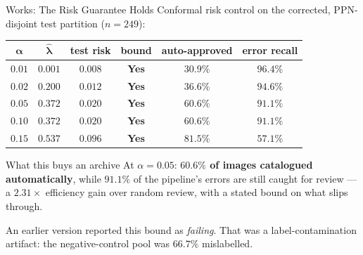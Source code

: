 \documentclass[aspectratio=169,11pt]{beamer}
\newcommand{\yes}{\textcolor{PrismGreen}{\textbf{Yes}}}
\begin{document}
\begin{frame}{Works: The Risk Guarantee Holds}
\small
Conformal risk control on the corrected, PPN-disjoint test partition ($n=249$):
\vspace{1mm}
\begin{center}
\footnotesize
\begin{tabular}{@{}c c c c c c@{}}
\toprule
$\bm\alpha$ & $\bm{\hat\lambda}$ & \textbf{test risk} & \textbf{bound} & \textbf{auto-approved} & \textbf{error recall} \\
\midrule
$0.01$ & $0.001$ & $0.008$ & \yes & $30.9\%$ & $96.4\%$ \\
$0.02$ & $0.200$ & $0.012$ & \yes & $36.6\%$ & $94.6\%$ \\
$\mathbf{0.05}$ & $\mathbf{0.372}$ & $\mathbf{0.020}$ & \yes & $\mathbf{60.6\%}$ & $\mathbf{91.1\%}$ \\
$0.10$ & $0.372$ & $0.020$ & \yes & $60.6\%$ & $91.1\%$ \\
$0.15$ & $0.537$ & $0.096$ & \yes & $81.5\%$ & $57.1\%$ \\
\bottomrule
\end{tabular}
\end{center}
\vspace{1mm}
\begin{exampleblock}{\small What this buys an archive}
\footnotesize At $\alpha=0.05$: \textbf{$60.6\%$ of images catalogued automatically}, while $91.1\%$ of the pipeline's errors are still caught for review --- a $2.31\times$ efficiency gain over random review, with a stated bound on what slips through.
\end{exampleblock}
\vspace{1mm}
\footnotesize An earlier version reported this bound as \emph{failing}. That was a label-contamination artifact: the negative-control pool was $66.7\%$ mislabelled.
\end{frame}
\end{document}
